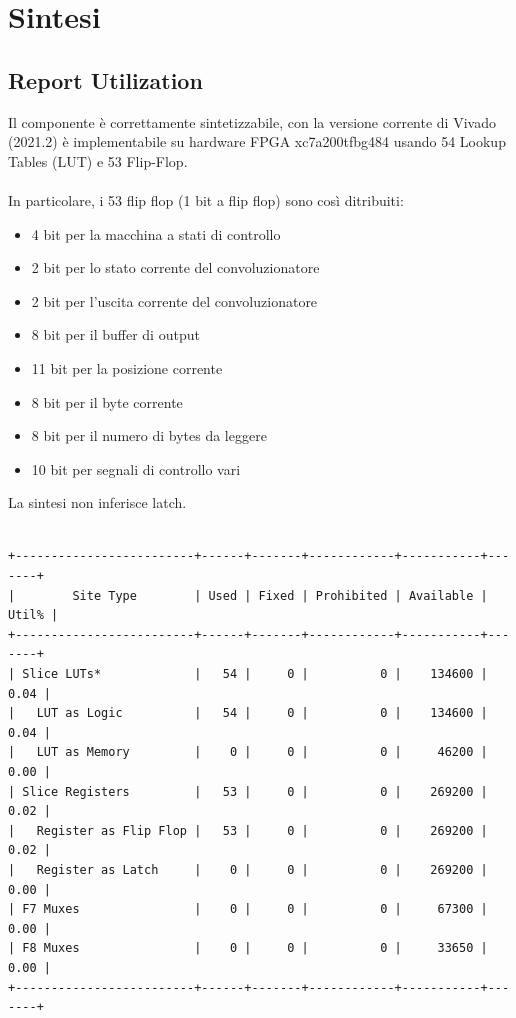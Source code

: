 \documentclass[12pt, a4paper]{article}
\begin{document}
\pagebreak

\section{Sintesi}

\subsection{Report Utilization}

Il componente è correttamente sintetizzabile, con la versione corrente di Vivado (2021.2) è implementabile su hardware FPGA
xc7a200tfbg484 usando 54 Lookup Tables (LUT) e 53 Flip-Flop.
\\
\\
\noindent In particolare, i 53 flip flop (1 bit a flip flop) sono così ditribuiti:
\begin{itemize}[itemsep=4pt, topsep=4pt]
    \item 4 bit per la macchina a stati di controllo
    \item 2 bit per lo stato corrente del convoluzionatore
    \item 2 bit per l'uscita corrente del convoluzionatore
    \item 8 bit per il buffer di output
    \item 11 bit per la posizione corrente
    \item 8 bit per il byte corrente
    \item 8 bit per il numero di bytes da leggere
    \item 10 bit per segnali di controllo vari
\end{itemize}

\noindent La sintesi non inferisce latch.

\begin{verbatim}

+-------------------------+------+-------+------------+-----------+-------+
|        Site Type        | Used | Fixed | Prohibited | Available | Util% |
+-------------------------+------+-------+------------+-----------+-------+
| Slice LUTs*             |   54 |     0 |          0 |    134600 |  0.04 |
|   LUT as Logic          |   54 |     0 |          0 |    134600 |  0.04 |
|   LUT as Memory         |    0 |     0 |          0 |     46200 |  0.00 |
| Slice Registers         |   53 |     0 |          0 |    269200 |  0.02 |
|   Register as Flip Flop |   53 |     0 |          0 |    269200 |  0.02 |
|   Register as Latch     |    0 |     0 |          0 |    269200 |  0.00 |
| F7 Muxes                |    0 |     0 |          0 |     67300 |  0.00 |
| F8 Muxes                |    0 |     0 |          0 |     33650 |  0.00 |
+-------------------------+------+-------+------------+-----------+-------+

\end{verbatim}
\end{document}
